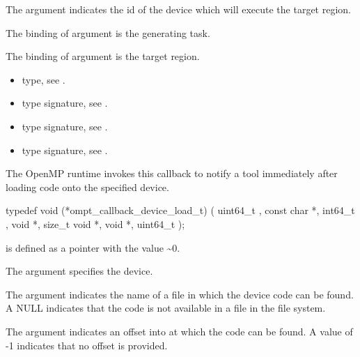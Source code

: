 \epdesc

The argument  indicates the id of the device
which will execute the target region.

The binding of argument  is the generating task.

The binding of argument  is the target region.

\codeptrdesc

\crossreferences
\begin{itemize}
\item {} type, see
.
\item {} type signature, see
.
\item {} type signature, see
.
\item {} type signature, see
.
\end{itemize}

\label{sec:ompt_callback_device_load_t}

\summary
The OpenMP runtime invokes this callback to notify a tool immediately after loading code onto the specified device.

\format


\begin{ccppspecific}
\begin{omptCallback}
typedef void (*ompt_callback_device_load_t) (
  uint64_t ,
  const char *,
  int64_t ,
  void *,
  size_t 
  void *,
  void *,
  uint64_t 
);
\end{omptCallback}

\end{ccppspecific}
 is defined as a pointer with the value \textasciitilde 0.


\argdesc
The argument  specifies the device.

The argument  indicates the name of a file in which the device code can be found. A NULL  indicates that the code is not available in a file in the file system.

The argument  indicates an offset into  at which the code can be found. A value of -1 indicates that
no offset is provided.

